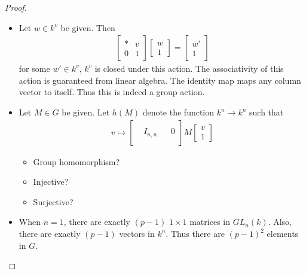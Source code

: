 \documentclass[12pt, psamsfonts]{amsart}
\theoremstyle{definition}
\theoremstyle{remark}
\numberwithin{equation}{section}
\begin{document}
\begin{proof}
  $ $
  \begin{itemize}
    \item
      Let $w \in k^v$ be given.
      Then 
      \begin{align*}
        \begin{bmatrix} * & v \\ 0 & 1 \end{bmatrix}
          \begin{bmatrix} w \\ 1 \end{bmatrix}
            = \begin{bmatrix} w' \\ 1 \end{bmatrix}
      \end{align*}
      for some $w' \in k^v$, $k^v$ is closed under this action.
      The associativity of this action is guaranteed from linear algebra.
      The identity map maps any column vector to itself.
      Thus this is indeed a group action.
    \item
      Let $M \in G$ be given.
      Let $h(M)$ denote the function $k^n \rightarrow k^n$ such that
      \begin{align*}
        v \mapsto
        \left[
        \begin{array}{ccc|c} 
        &          &     & \\
        & I_{n, n} &     & 0 \\
        & & & \end{array} \right]
          M \begin{bmatrix} v \\ 1 \end{bmatrix}
      \end{align*}
      \begin{itemize}
        \item
          Group homomorphism?
        \item
          Injective?
        \item
          Surjective?
      \end{itemize}
    \item
      When $n = 1$, there are exactly $(p - 1)$ $1 \times 1$ matrices in $GL_n(k)$.
      Also, there are exactly $(p - 1)$ vectors in $k^n$.
      Thus there are $(p - 1)^2$ elements in $G$.
  \end{itemize}
\end{proof}
\end{document}

